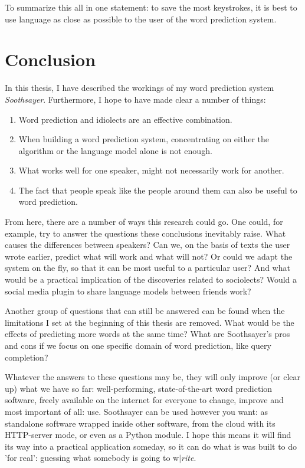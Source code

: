\documentclass[11pt]{article}
\begin{document}
To summarize this all in one statement: to save the most keystrokes, it is best to use language as close as possible to the user of the word prediction system.










\section{Conclusion} \label{conclusion}
In this thesis, I have described the workings of my word prediction system \emph{Soothsayer}. Furthermore, I hope to have made clear a number of things:

\begin{enumerate}
\item Word prediction and idiolects are an effective combination.
\item When building a word prediction system, concentrating on either the algorithm or the language model alone is not enough.
\item What works well for one speaker, might not necessarily work for another.
\item The fact that people speak like the people around them can also be useful to word prediction.
\end{enumerate}

From here, there are a number of ways this research could go. One could, for example, try to answer the questions these conclusions inevitably raise. What causes the differences between speakers? Can we, on the basis of texts the user wrote earlier, predict what will work and what will not? Or could we adapt the system on the fly, so that it can be most useful to a particular user? And what would be a practical implication of the discoveries related to sociolects? Would a social media plugin to share language models between friends work? 

Another group of questions that can still be answered can be found when the limitations I set at the beginning of this thesis are removed. What would be the effects of predicting more words at the same time? What are Soothsayer's pros and cons if we focus on one specific domain of word prediction, like query completion?

Whatever the answers to these questions may be, they will only improve (or clear up) what we have so far: well-performing, state-of-the-art word prediction software, freely available on the internet for everyone to change, improve and most important of all: use. Soothsayer can be used however you want: as standalone software wrapped inside other software, from the cloud with its HTTP-server mode, or even as a Python module. I hope this means it will find its way into a practical application someday, so it can do what is was built to do 'for real': guessing what somebody is going to w$|$\emph{rite}.
\end{document}
